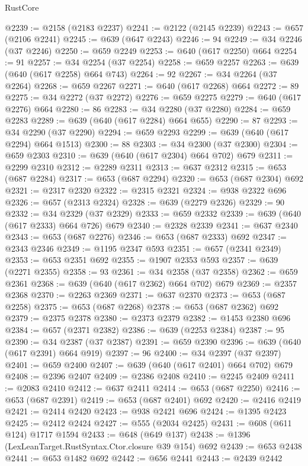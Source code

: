 \begin{lexlean}{RustCore}
\begin{coremodule}
@2239 := @2158 (@2183 @2237)
@2241 := @2122 (@2145 @2239)
@2243 := @657 (@2106 @2241)
@2245 := @639 (@647 @2243)
@2246 := 94
@2249 := @34 @2246 (@37 @2246)
@2250 := @659 @2249
@2253 := @640 (@617 @2250) @664
@2254 := 91
@2257 := @34 @2254 (@37 @2254)
@2258 := @659 @2257
@2263 := @639 (@640 (@617 @2258) @664 @743)
@2264 := 92
@2267 := @34 @2264 (@37 @2264)
@2268 := @659 @2267
@2271 := @640 (@617 @2268) @664
@2272 := 89
@2275 := @34 @2272 (@37 @2272)
@2276 := @659 @2275
@2279 := @640 (@617 @2276) @664
@2280 := 86
@2283 := @34 @2280 (@37 @2280)
@2284 := @659 @2283
@2289 := @639 (@640 (@617 @2284) @664 @655)
@2290 := 87
@2293 := @34 @2290 (@37 @2290)
@2294 := @659 @2293
@2299 := @639 (@640 (@617 @2294) @664 @1513)
@2300 := 88
@2303 := @34 @2300 (@37 @2300)
@2304 := @659 @2303
@2310 := @639 (@640 (@617 @2304) @664 @702) @679
@2311 := @2299 @2310
@2312 := @2289 @2311
@2313 := @637 @2312
@2315 := @653 (@687 @2284)
@2317 := @653 (@687 @2294)
@2320 := @653 (@687 @2304) @692
@2321 := @2317 @2320
@2322 := @2315 @2321
@2324 := @938 @2322 @696
@2326 := @657 (@2313 @2324)
@2328 := @639 (@2279 @2326)
@2329 := 90
@2332 := @34 @2329 (@37 @2329)
@2333 := @659 @2332
@2339 := @639 (@640 (@617 @2333) @664 @726) @679
@2340 := @2328 @2339
@2341 := @637 @2340
@2343 := @653 (@687 @2276)
@2346 := @653 (@687 @2333) @692
@2347 := @2343 @2346
@2349 := @1195 @2347 @593
@2351 := @657 (@2341 @2349)
@2353 := @653 @2351 @692
@2355 := @1907 @2353 @593
@2357 := @639 (@2271 @2355)
@2358 := 93
@2361 := @34 @2358 (@37 @2358)
@2362 := @659 @2361
@2368 := @639 (@640 (@617 @2362) @664 @702) @679
@2369 := @2357 @2368
@2370 := @2263 @2369
@2371 := @637 @2370
@2373 := @653 (@687 @2258)
@2375 := @653 (@687 @2268)
@2378 := @653 (@687 @2362) @692
@2379 := @2375 @2378
@2380 := @2373 @2379
@2382 := @1453 @2380 @696
@2384 := @657 (@2371 @2382)
@2386 := @639 (@2253 @2384)
@2387 := 95
@2390 := @34 @2387 (@37 @2387)
@2391 := @659 @2390
@2396 := @639 (@640 (@617 @2391) @664 @919)
@2397 := 96
@2400 := @34 @2397 (@37 @2397)
@2401 := @659 @2400
@2407 := @639 (@640 (@617 @2401) @664 @702) @679
@2408 := @2396 @2407
@2409 := @2386 @2408
@2410 := @2245 @2409
@2411 := @2083 @2410
@2412 := @637 @2411
@2414 := @653 (@687 @2250)
@2416 := @653 (@687 @2391)
@2419 := @653 (@687 @2401) @692
@2420 := @2416 @2419
@2421 := @2414 @2420
@2423 := @938 @2421 @696
@2424 := @1395 @2423
@2425 := @2412 @2424
@2427 := @555 (@2034 @2425)
@2431 := @608 (@611 @124) @1717 @1594
@2433 := @648 (@649 @137)
@2438 := @1396 (LexLeanTarget.RustSyntax.Ctor.closure @39 @154) @692
@2439 := @653 @2438
@2441 := @653 @1482 @692
@2442 := @656 @2441
@2443 := @2439 @2442

\end{coremodule}
\end{lexlean}

